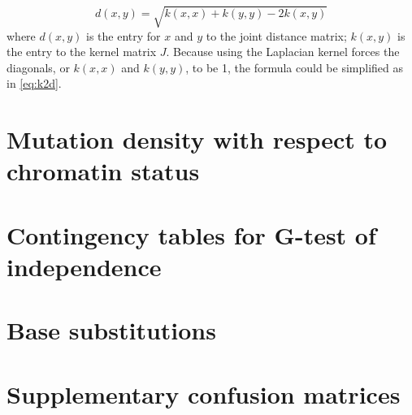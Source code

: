 \begin{equation}
    d(x,y) = \sqrt{k(x,x) + k(y,y) - 2k(x,y)} 
    \label{eq:k2d_ori}
\end{equation}
where $d(x,y)$ is the entry for $x$ and $y$ to the joint distance matrix; $k(x,y)$ is the entry to the kernel matrix $J$. Because using the Laplacian kernel forces the diagonals, or $k(x,x)$ and $k(y,y)$, to be 1, the formula could be simplified as in \ref{eq:k2d}.

\newpage
\section{Mutation density with respect to chromatin status}



\newpage
\section{Contingency tables for G-test of independence}\label{apdx:g-test}



\newpage
\section{Base substitutions}



\newpage
\section{Supplementary confusion matrices}



